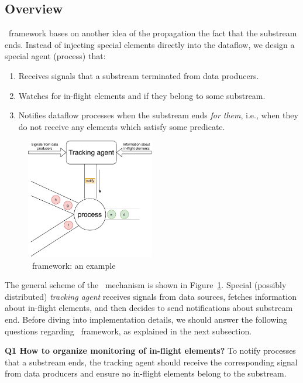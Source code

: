 \label{fs-acker-preliminaries}

\subsection{Overview}

\tracker\ framework bases on another idea of the propagation the fact that the substream ends. Instead of injecting special elements directly into the dataflow, we design a special agent (process) that:

\begin{enumerate}
    \item Receives signals that a substream terminated from data producers.
    \item Watches for in-flight elements and if they belong to some substream.
    \item Notifies dataflow processes when the substream ends {\em for them}, i.e., when they do not receive any elements which satisfy some predicate.
\end{enumerate}

\begin{figure}[htbp]
  \centering
  \includegraphics[width=0.50\textwidth]{pics/tracker-scheme.pdf}
  \caption{\tracker\ framework: an example}
  \label{tracker_scheme}
\end{figure}

The general scheme of the \tracker\ mechanism is shown in Figure~\ref{tracker_scheme}. Special (possibly distributed) {\em tracking agent} receives signals from data sources, fetches information about in-flight elements, and then decides to send notifications about substream end. Before diving into implementation details, we should answer the following questions regarding \tracker\ framework, as explained in the next subsection.

{\bf Q1 How to organize monitoring of in-flight elements?} To notify processes that a substream ends, the tracking agent should receive the corresponding signal from data producers and ensure no in-flight elements belong to the substream. 

